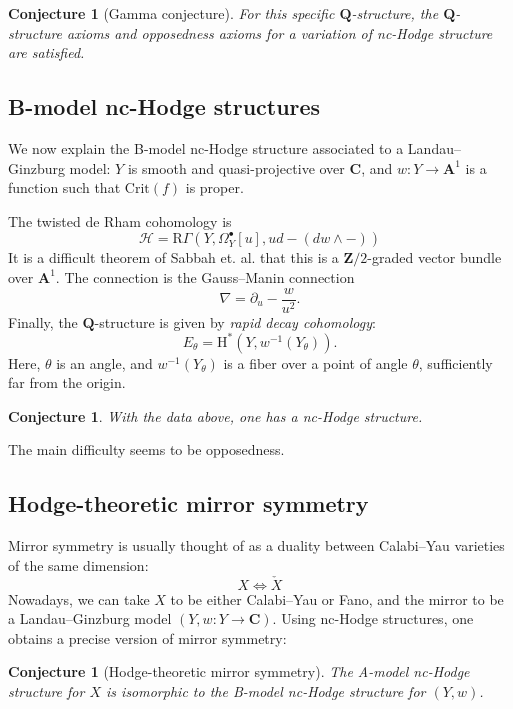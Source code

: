 \documentclass[11pt, reqno]{amsart}
\numberwithin{equation}{section}
\theoremstyle{plain}
\newtheorem{conjecture}[theorem]{Conjecture}
\theoremstyle{definition}
\theoremstyle{italicsname}
\newcommand{\cH}{\mathcal{H}}
\newcommand{\rH}{\mathrm{H}}
\newcommand{\rR}{\mathrm{R}}
\newcommand{\bA}{\mathbf{A}}
\newcommand{\bC}{\mathbf{C}}
\newcommand{\bZ}{\mathbf{Z}}
\newcommand{\bQ}{\mathbf{Q}}
\newcommand{\Crit}{\mathrm{Crit}}
\newcommand{\james}[1]{\leavevmode{\color{magenta}{#1}}}
\newcommand{\todo}[1]{\vspace{5 mm}\par \noindent
\marginpar{\hfill \textsc{ToDo}}
\framebox{\begin{minipage}[c]{0.95 \textwidth}
 #1 \end{minipage}}\vspace{5 mm}\par}
\begin{document}
\todo{\james{What is $\gamma$?}}

\begin{conjecture}[Gamma conjecture]
    For this specific $\bQ$-structure, the $\bQ$-structure axioms and opposedness axioms for a variation of nc-Hodge structure are satisfied.
\end{conjecture}

\subsection*{B-model nc-Hodge structures}

We now explain the B-model nc-Hodge structure associated to a Landau--Ginzburg model: $Y$ is smooth and quasi-projective over $\bC$, and $w:Y \to \bA^1$ is a function such that $\Crit(f)$ is proper. 

The twisted de Rham cohomology is 
\[
    \cH = \rR \Gamma(Y, \Omega_Y^\bullet[u], ud - (dw \wedge-))
\]
It is a difficult theorem of Sabbah et. al. that this is a $\bZ/2$-graded vector bundle over $\bA^1$. The connection is the Gauss--Manin connection
\[
    \nabla = \partial_u - \frac{w}{u^2}.
\]
Finally, the $\bQ$-structure is given by \emph{rapid decay cohomology}: 
\[
    E_{\theta} = \rH^*(Y, w^{-1}(Y_{\theta})).
\]
Here, $\theta$ is an angle, and $w^{-1}(Y_{\theta})$ is a fiber over a point of angle $\theta$, sufficiently far from the origin. 

\begin{conjecture}
    With the data above, one has a nc-Hodge structure. 
\end{conjecture}

The main difficulty seems to be opposedness.

\subsection*{Hodge-theoretic mirror symmetry}
Mirror symmetry is usually thought of as a duality between Calabi--Yau varieties of the same dimension:
\[
    X \iff \check X
\]
Nowadays, we can take $X$ to be either Calabi--Yau or Fano, and the mirror to be a Landau--Ginzburg model $(Y, w:Y \to \bC)$.
Using nc-Hodge structures, one obtains a precise version of mirror symmetry:

\begin{conjecture}[Hodge-theoretic mirror symmetry]
    The A-model nc-Hodge structure for $X$ is isomorphic to the B-model nc-Hodge structure for $(Y, w)$.
\end{conjecture}
\end{document}
